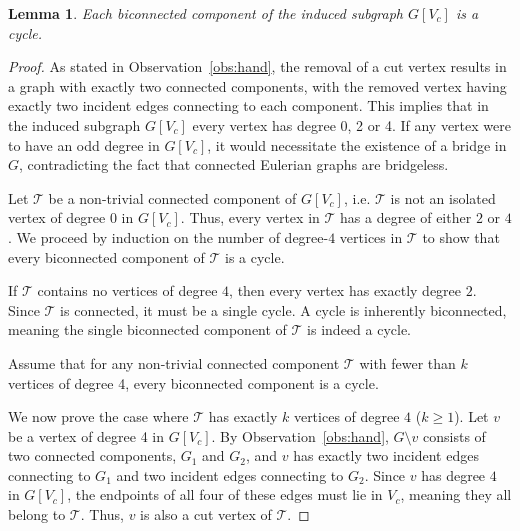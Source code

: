 \documentclass{article}
\newtheorem{lemma}{Lemma}
\begin{document}
        \begin{lemma}\label{lem:structure 4regular}
            Each biconnected component of the induced subgraph $G[V_c]$ is a cycle.
        \end{lemma}

        \begin{proof}
            As stated in Observation~\ref{obs:hand}, the removal of a cut vertex  results in a graph with exactly two connected components, with the removed vertex having exactly two incident edges connecting to each component.
            This implies that in the induced subgraph $G[V_c]$  every vertex has degree 0, 2 or 4. 
            If any vertex were to have an odd degree in $G[V_c]$, it would necessitate the existence of a bridge in $G$, contradicting the fact that connected Eulerian graphs are bridgeless.
            
            Let $\mathcal{T}$ be a non-trivial connected component of $G[V_c]$, i.e. $\mathcal{T}$ is not an isolated vertex of degree $0$ in $G[V_c]$.
            Thus, every vertex in $\mathcal{T}$ has a degree of either $2$ or $4$.
            We proceed by induction on the number of degree-$4$ vertices in $\mathcal{T}$ to show that every biconnected component of $\mathcal{T}$ is a cycle.
            
            If $\mathcal{T}$ contains no vertices of degree $4$, then every vertex has exactly degree $2$. 
            Since $\mathcal{T}$ is connected, it must be a single cycle. 
            A cycle is inherently biconnected, meaning the single biconnected component of $\mathcal{T}$ is indeed a cycle.
        
            Assume that for any non-trivial connected component $\mathcal{T}$ with fewer than $k$ vertices of degree 4, every biconnected component is a cycle.
        
            We now prove the case where $\mathcal{T}$ has exactly $k$ vertices of degree $4$ ($k \ge 1$).
            Let $v$ be a vertex of degree 4 in $G[V_c]$.
            By Observation~\ref{obs:hand}, $G\setminus v$ consists of two connected components, $G_1$ and $G_2$, and $v$ has exactly two incident edges connecting to $G_1$ and two incident edges connecting to $G_2$.
            Since $v$ has degree $4$ in $G[V_c]$, the endpoints of all four of these edges must lie in $V_c$, meaning they all belong to $\mathcal{T}$. 
            Thus, $v$ is also a cut vertex of $\mathcal{T}$. 
            

\end{proof}
\end{document}
